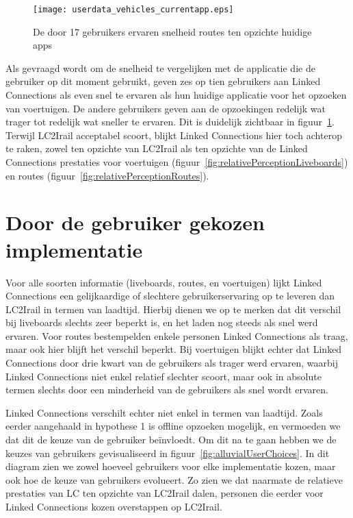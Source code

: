 \begin{figure}[ht]
	\centering
	\texttt{[image: userdata\_vehicles\_currentapp.eps]}
	\caption[Door gebruikers ervaren snelheid voertuigen tov huidige apps]{De door 17 gebruikers ervaren snelheid routes ten opzichte huidige apps }
	\label{fig:relativePerceptionVehicles}
\end{figure}

Als gevraagd wordt om de snelheid te vergelijken met de applicatie die de gebruiker op dit moment gebruikt, geven zes op tien gebruikers aan Linked Connections als even snel te ervaren als hun huidige applicatie voor het opzoeken van voertuigen. De andere gebruikers geven aan de opzoekingen redelijk wat trager tot redelijk wat sneller te ervaren. Dit is duidelijk zichtbaar in figuur~\ref{fig:relativePerceptionVehicles}. Terwijl LC2Irail acceptabel scoort, blijkt Linked Connections hier toch achterop te raken, zowel ten opzichte van LC2Irail als ten opzichte van de Linked Connections prestaties voor voertuigen (figuur~\ref{fig:relativePerceptionLiveboards}) en routes (figuur~\ref{fig:relativePerceptionRoutes}).

\section{Door de gebruiker gekozen implementatie}

Voor alle soorten informatie (liveboards, routes, en voertuigen) lijkt Linked Connections een gelijkaardige of slechtere gebruikerservaring op te leveren dan LC2Irail in termen van laadtijd. Hierbij dienen we op te merken dat dit verschil bij liveboards slechts zeer beperkt is, en het laden nog steeds als snel werd ervaren. Voor routes bestempelden enkele personen Linked Connections als traag, maar ook hier blijft het verschil beperkt. Bij voertuigen blijkt echter dat Linked Connections door drie kwart van de gebruikers als trager werd ervaren, waarbij Linked Connections niet enkel relatief slechter scoort, maar ook in absolute termen slechts door een minderheid van de gebruikers als snel wordt ervaren. 

Linked Connections verschilt echter niet enkel in termen van laadtijd. Zoals eerder aangehaald in hypothese 1 is offline opzoeken mogelijk, en vermoeden we dat dit de keuze van de gebruiker beïnvloedt. Om dit na te gaan hebben we de keuzes van gebruikers gevisualiseerd in figuur~\ref{fig:alluvialUserChoices}. In dit diagram zien we zowel hoeveel gebruikers voor elke implementatie kozen, maar ook hoe de keuze van gebruikers evolueert. Zo zien we dat naarmate de relatieve prestaties van LC ten opzichte van LC2Irail dalen, personen die eerder voor Linked Connections kozen overstappen op LC2Irail.

